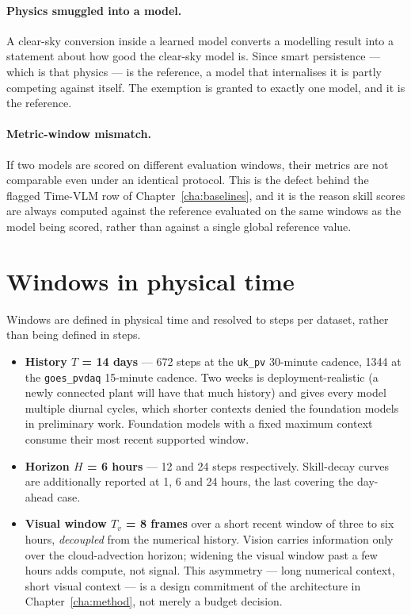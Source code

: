 \paragraph{Physics smuggled into a model.} A clear-sky conversion inside a learned model
converts a modelling result into a statement about how good the clear-sky model is. Since
smart persistence --- which is that physics --- is the reference, a model that internalises it
is partly competing against itself. The exemption is granted to exactly one model, and it is
the reference.

\paragraph{Metric-window mismatch.} If two models are scored on different evaluation windows,
their metrics are not comparable even under an identical protocol. This is the defect behind
the flagged Time-VLM row of Chapter~\ref{cha:baselines}, and it is the reason skill scores are
always computed against the reference evaluated on the same windows as the model being
scored, rather than against a single global reference value.

\section{Windows in physical time}
\label{sec:windows}

Windows are defined in physical time and resolved to steps per dataset, rather than being
defined in steps.

\begin{itemize}
  \item \textbf{History $T$ = 14 days} --- 672 steps at the \texttt{uk\_pv} 30-minute
    cadence, 1344 at the \texttt{goes\_pvdaq} 15-minute cadence. Two weeks is
    deployment-realistic (a newly connected plant will have that much history) and gives
    every model multiple diurnal cycles, which shorter contexts denied the foundation
    models in preliminary work. Foundation models with a fixed maximum context consume
    their most recent supported window.
  \item \textbf{Horizon $H$ = 6 hours} --- 12 and 24 steps respectively. Skill-decay curves
    are additionally reported at 1, 6 and 24 hours, the last covering the day-ahead case.
  \item \textbf{Visual window $T_v$ = 8 frames} over a short recent window of three to six
    hours, \emph{decoupled} from the numerical history. Vision carries information only over
    the cloud-advection horizon; widening the visual window past a few hours adds compute,
    not signal. This asymmetry --- long numerical context, short visual context --- is a
    design commitment of the architecture in Chapter~\ref{cha:method}, not merely a budget
    decision.
\end{itemize}

